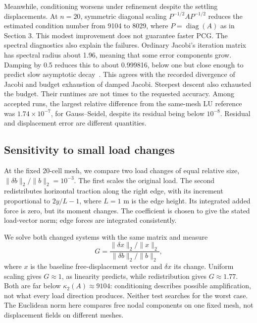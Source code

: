 Meanwhile, conditioning worsens under refinement despite the settling
displacements. At $n=20$, symmetric diagonal scaling
$P^{-1/2}AP^{-1/2}$ reduces the estimated condition number from 9104 to
8029, where $P=\operatorname{diag}(A)$ as in Section 3. This modest
improvement does not guarantee faster PCG.
The spectral diagnostics also explain the failures. Ordinary Jacobi's
iteration matrix has spectral radius about 1.96, meaning that some error
components grow. Damping by 0.5 reduces this to about 0.999816, below
one but close enough to predict slow asymptotic decay~\cite{saad-iterative}.
This agrees with the recorded divergence of Jacobi and budget exhaustion
of damped Jacobi. Steepest descent also exhausted the budget. Their
runtimes are not times to the requested accuracy. Among accepted runs,
the largest relative difference from the same-mesh LU reference was
$1.74\times10^{-7}$, for Gauss--Seidel, despite its residual being below
$10^{-8}$. Residual and displacement error are different quantities.

\subsection{Sensitivity to small load changes}
At the fixed 20-cell mesh, we compare two load changes of equal relative
size, $\lVert\delta b\rVert_2/\lVert b\rVert_2=10^{-3}$.
The first scales the original load. The second redistributes horizontal
traction along the right edge, with its increment proportional to
$2y/L-1$, where $L=1$ m is the edge height. Its integrated added force
is zero, but its moment changes. The coefficient is chosen to give the
stated load-vector norm; edge forces are integrated consistently.

We solve both changed systems with the same matrix and measure
\begin{equation}
 G=\frac{\lVert\delta x\rVert_2/\lVert x\rVert_2}
          {\lVert\delta b\rVert_2/\lVert b\rVert_2},
 \label{eq:results-amplification}
\end{equation}
where $x$ is the baseline free-displacement vector and $\delta x$ its
change. Uniform scaling gives $G\approx1$, as linearity predicts, while
redistribution gives $G\approx1.77$. Both are far below
$\kappa_2(A)\approx9104$: conditioning describes possible amplification,
not what every load direction produces. Neither test searches for the worst case.
The Euclidean norm here compares free nodal components on one fixed mesh,
not displacement fields on different meshes.


